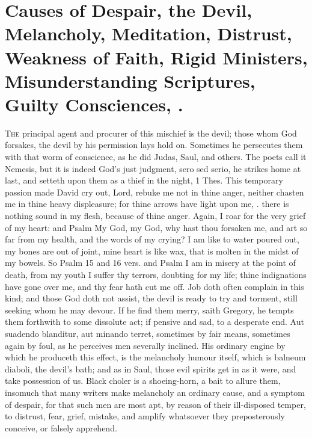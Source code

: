 {\section[Causes of Despair]{Causes of Despair, the Devil, Melancholy, Meditation, Distrust, Weakness of Faith, Rigid Ministers, Misunderstanding Scriptures, Guilty Consciences, \etc{}.}
\lettrine{T}{he} principal agent and procurer of this mischief is the devil; those
whom God forsakes, the devil by his permission lays hold on. Sometimes
he persecutes them with that worm of conscience, as he did Judas,
Saul, and others. The poets call it Nemesis, but it is indeed
God's just judgment, sero sed serio, he strikes home at last, and
setteth upon them as a thief in the night, 1 Thes.  This
temporary passion made David cry out, Lord, rebuke me not in thine
anger, neither chasten me in thine heavy displeasure; for thine arrows
have light upon me, \etc{}. there is nothing sound in my flesh, because of
thine anger. Again, I roar for the very grief of my heart: and Psalm
 My God, my God, why hast thou forsaken me, and art so far from my
health, and the words of my crying? I am like to water poured out, my
bones are out of joint, mine heart is like wax, that is molten in the
midst of my bowels. So Psalm  15 and 16 vers. and Psalm  I
am in misery at the point of death, from my youth I suffer thy terrors,
doubting for my life; thine indignations have gone over me, and thy
fear hath cut me off. Job doth often complain in this kind; and those
God doth not assist, the devil is ready to try and torment, still
seeking whom he may devour. If he find them merry, saith Gregory, he
tempts them forthwith to some dissolute act; if pensive and sad, to a
desperate end. Aut suadendo blanditur, aut minando terret, sometimes by
fair means, sometimes again by foul, as he perceives men severally
inclined. His ordinary engine by which he produceth this effect, is the
melancholy humour itself, which is balneum diaboli, the devil's bath;
and as in Saul, those evil spirits get in as it were, and take
possession of us. Black choler is a shoeing-horn, a bait to allure
them, insomuch that many writers make melancholy an ordinary cause, and
a symptom of despair, for that such men are most apt, by reason of
their ill-disposed temper, to distrust, fear, grief, mistake, and
amplify whatsoever they preposterously conceive, or falsely apprehend.

}
